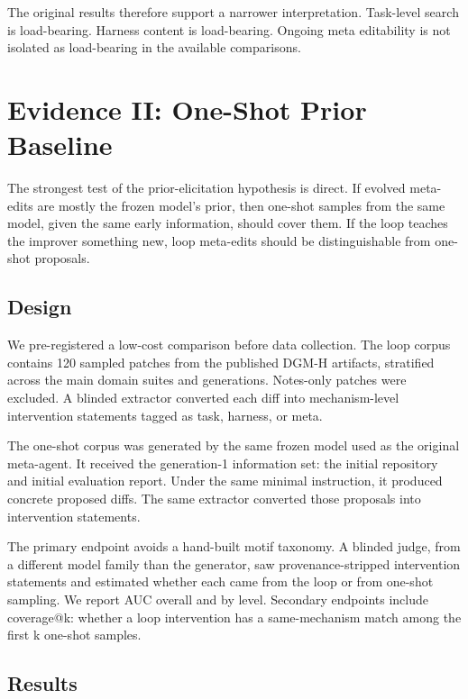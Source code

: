 \documentclass[11pt]{article}
\begin{document}
The original results therefore support a narrower interpretation. Task-level search is load-bearing. Harness content is load-bearing. Ongoing meta editability is not isolated as load-bearing in the available comparisons.

\section{Evidence II: One-Shot Prior Baseline}\label{evidence-ii-one-shot-prior-baseline}

The strongest test of the prior-elicitation hypothesis is direct. If evolved meta-edits are mostly the frozen model's prior, then one-shot samples from the same model, given the same early information, should cover them. If the loop teaches the improver something new, loop meta-edits should be distinguishable from one-shot proposals.

\subsection{Design}\label{design}

We pre-registered a low-cost comparison before data collection. The loop corpus contains 120 sampled patches from the published DGM-H artifacts, stratified across the main domain suites and generations. Notes-only patches were excluded. A blinded extractor converted each diff into mechanism-level intervention statements tagged as task, harness, or meta.

The one-shot corpus was generated by the same frozen model used as the original meta-agent. It received the generation-1 information set: the initial repository and initial evaluation report. Under the same minimal instruction, it produced concrete proposed diffs. The same extractor converted those proposals into intervention statements.

The primary endpoint avoids a hand-built motif taxonomy. A blinded judge, from a different model family than the generator, saw provenance-stripped intervention statements and estimated whether each came from the loop or from one-shot sampling. We report AUC overall and by level. Secondary endpoints include coverage@k: whether a loop intervention has a same-mechanism match among the first k one-shot samples.

\subsection{Results}\label{results}
\end{document}
